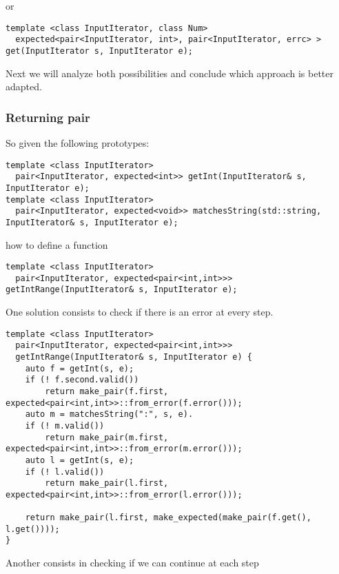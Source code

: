 \documentclass[a4paper,10pt]{article}
\begin{document}
or 

\begin{lstlisting}
template <class InputIterator, class Num>
  expected<pair<InputIterator, int>, pair<InputIterator, errc> > get(InputIterator s, InputIterator e);
\end{lstlisting}




Next we will analyze both possibilities and conclude which approach is better adapted.

\subsubsection{Returning pair}

So given the following prototypes:

\begin{lstlisting}
template <class InputIterator>
  pair<InputIterator, expected<int>> getInt(InputIterator& s, InputIterator e);
template <class InputIterator>
  pair<InputIterator, expected<void>> matchesString(std::string, InputIterator& s, InputIterator e);
\end{lstlisting}

how to define a function

\begin{lstlisting}
template <class InputIterator>
  pair<InputIterator, expected<pair<int,int>>> getIntRange(InputIterator& s, InputIterator e);
\end{lstlisting}


One solution consists to check if there is an error at every step. 

\begin{lstlisting}
template <class InputIterator>
  pair<InputIterator, expected<pair<int,int>>> 
  getIntRange(InputIterator& s, InputIterator e) {
    auto f = getInt(s, e);
    if (! f.second.valid())  
        return make_pair(f.first, expected<pair<int,int>>::from_error(f.error()));
    auto m = matchesString(":", s, e).
    if (! m.valid())  
        return make_pair(m.first, expected<pair<int,int>>::from_error(m.error()));
    auto l = getInt(s, e);
    if (! l.valid())   
        return make_pair(l.first, expected<pair<int,int>>::from_error(l.error()));
        
    return make_pair(l.first, make_expected(make_pair(f.get(), l.get())));
}
\end{lstlisting}

Another consists in checking if we can continue at each step
\end{document}
